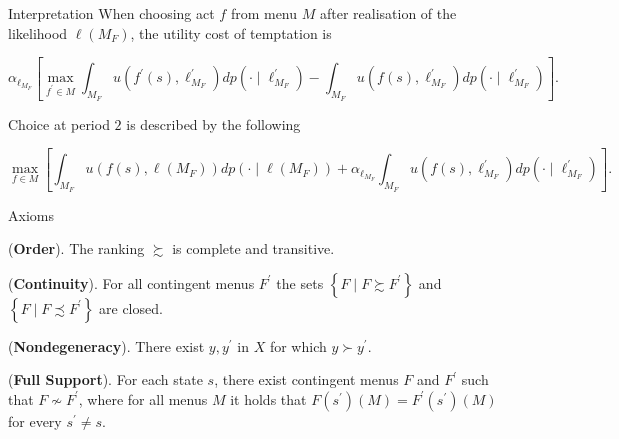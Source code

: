 \documentclass[usenames,dvipsnames,aspectratio=169,11pt, envcountsect, handout]{beamer}
\begin{document}
\begin{frame}{Interpretation}
	When choosing act \( f \) from menu \( M \) after realisation of the likelihood \( \ell \left(M_F \right) \), the utility cost of temptation is

	\vfill

	\[
		\alpha _{\ell_{M_F}} \left[ \max _{f^{\prime} \in M} \int_{M_F} u\left(f^{\prime}\left(s \right) , \ell^{\prime}_{M_F} \right) d p\left(\cdot \mid \ell^{\prime}_{M_F} \right) - \int_{M_F} u \left( f \left(s \right) ,  \ell^{\prime}_{M_F} \right) d p\left(\cdot \mid \ell^{\prime}_{M_F} \right) \right] .
	\] \pause

	\vfill


	Choice at period \( 2 \) is described by the following

	\vfill


	\[
		\max _{f \in M} \left[ \int_{M_F} u \left( f \left( s \right), \ell \left( M_{F} \right) \right) d p\left(\cdot \mid \ell \left(M_F \right) \right) +\alpha _{\ell_{M_F}} \int_{M_F} u \left( f \left(s \right) ,  \ell^{\prime}_{M_F} \right) d p\left(\cdot \mid \ell^{\prime}_{M_F} \right) \right].
	\]

\end{frame}

\begin{frame}{Axioms}


	\begin{axiom}
	\end{axiom}

	\vfill

	(\textbf{Order}). The ranking \(\succsim\) is complete and transitive.

	\vfill

	(\textbf{Continuity}). For all contingent menus \( F^{\prime} \) the sets \( \left\{ F \mid F \succsim F^{\prime} \right\} \) and \( \left\{ F \mid F \precsim F^{\prime} \right\} \) are closed.

	\vfill

	(\textbf{Nondegeneracy}). There exist \(y, y^{\prime}\) in \(X\) for which \(y \succ y^{\prime}\).

	\vfill

	(\textbf{\textbf{Full Support}}). For each state \(s\), there exist contingent menus \(F \) and \(F^{\prime}\) such that \(F \nsim F^{\prime}\), where for all menus \( M \) it holds that \(F\left( s^{\prime}\right) \left( M \right) =F^{\prime}\left( s^{\prime}\right) \left( M \right)\) for every \(s^{\prime} \neq s \).

\end{frame}
\end{document}
